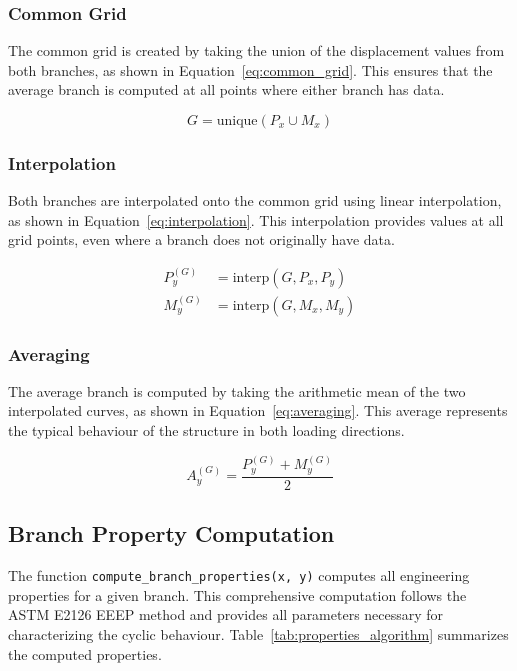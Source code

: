 \documentclass[11pt,a4paper]{article}
\begin{document}
\subsubsection{Common Grid}

The common grid is created by taking the union of the displacement values from both branches, as shown in Equation~\ref{eq:common_grid}. This ensures that the average branch is computed at all points where either branch has data.

\begin{equation}
G = \text{unique}(P_x \cup M_x)
\label{eq:common_grid}
\end{equation}

\subsubsection{Interpolation}

Both branches are interpolated onto the common grid using linear interpolation, as shown in Equation~\ref{eq:interpolation}. This interpolation provides values at all grid points, even where a branch does not originally have data.

\begin{align}
P_y^{(G)} &= \text{interp}(G, P_x, P_y) \\
M_y^{(G)} &= \text{interp}(G, M_x, M_y)
\label{eq:interpolation}
\end{align}

\subsubsection{Averaging}

The average branch is computed by taking the arithmetic mean of the two interpolated curves, as shown in Equation~\ref{eq:averaging}. This average represents the typical behaviour of the structure in both loading directions.

\begin{equation}
A_y^{(G)} = \frac{P_y^{(G)} + M_y^{(G)}}{2}
\label{eq:averaging}
\end{equation}

\subsection{Branch Property Computation}

The function \texttt{compute\_branch\_properties(x, y)} computes all engineering properties for a given branch. This comprehensive computation follows the ASTM E2126 EEEP method and provides all parameters necessary for characterizing the cyclic behaviour. Table~\ref{tab:properties_algorithm} summarizes the computed properties.
\end{document}
